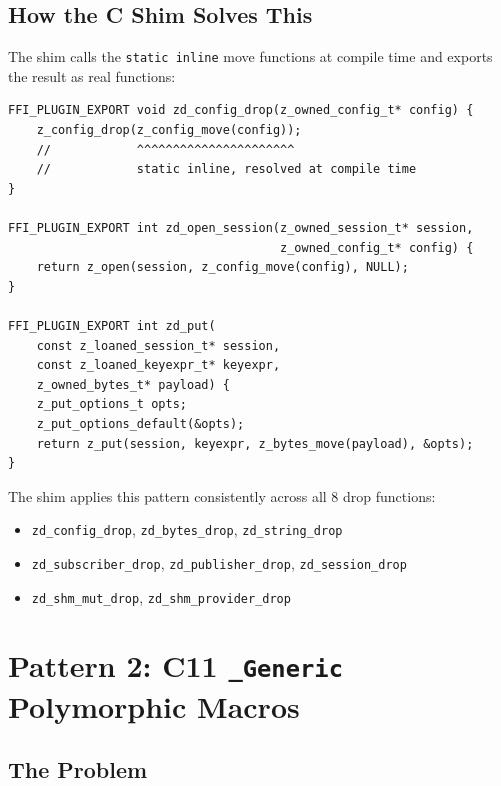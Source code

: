 \documentclass[11pt,a4paper]{article}
\newcommand{\code}[1]{\texttt{#1}}
\newcommand{\fn}[1]{\texttt{#1}}
\begin{document}
\subsection{How the C Shim Solves This}

The shim calls the \code{static inline} move functions at compile time and
exports the result as real functions:

\begin{lstlisting}[style=cstyle,caption={Shim resolves \fn{z\_config\_move} at compile time}]
FFI_PLUGIN_EXPORT void zd_config_drop(z_owned_config_t* config) {
    z_config_drop(z_config_move(config));
    //            ^^^^^^^^^^^^^^^^^^^^^^
    //            static inline, resolved at compile time
}

FFI_PLUGIN_EXPORT int zd_open_session(z_owned_session_t* session,
                                      z_owned_config_t* config) {
    return z_open(session, z_config_move(config), NULL);
}

FFI_PLUGIN_EXPORT int zd_put(
    const z_loaned_session_t* session,
    const z_loaned_keyexpr_t* keyexpr,
    z_owned_bytes_t* payload) {
    z_put_options_t opts;
    z_put_options_default(&opts);
    return z_put(session, keyexpr, z_bytes_move(payload), &opts);
}
\end{lstlisting}

The shim applies this pattern consistently across all 8 drop functions:

\begin{itemize}[nosep]
  \item \fn{zd\_config\_drop}, \fn{zd\_bytes\_drop}, \fn{zd\_string\_drop}
  \item \fn{zd\_subscriber\_drop}, \fn{zd\_publisher\_drop}, \fn{zd\_session\_drop}
  \item \fn{zd\_shm\_mut\_drop}, \fn{zd\_shm\_provider\_drop}
\end{itemize}


\section{Pattern 2: C11 \code{\_Generic} Polymorphic Macros}
\label{sec:pattern2}

\subsection{The Problem}
\end{document}
